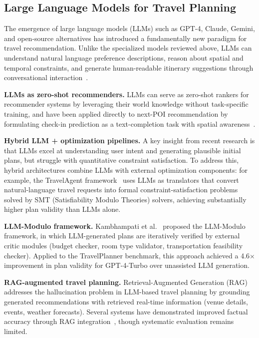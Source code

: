 \subsection{Large Language Models for Travel Planning}
\label{sec:sota-dl-llm}

The emergence of large language models (LLMs) such as GPT-4, Claude, Gemini, and open-source alternatives has introduced a fundamentally new paradigm for travel recommendation. Unlike the specialized models reviewed above, LLMs can understand natural language preference descriptions, reason about spatial and temporal constraints, and generate human-readable itinerary suggestions through conversational interaction~\cite{kozhipuram2025contextrag}.

\textbf{LLMs as zero-shot recommenders.} LLMs can serve as zero-shot rankers for recommender systems by leveraging their world knowledge without task-specific training, and have been applied directly to next-POI recommendation by formulating check-in prediction as a text-completion task with spatial awareness~\cite{li2024llm4poi}.

\textbf{Hybrid LLM + optimization pipelines.} A key insight from recent research is that LLMs excel at understanding user intent and generating plausible initial plans, but struggle with quantitative constraint satisfaction. To address this, hybrid architectures combine LLMs with external optimization components: for example, the TravelAgent framework~\cite{fan2024travelagent} uses LLMs as translators that convert natural-language travel requests into formal constraint-satisfaction problems solved by SMT (Satisfiability Modulo Theories) solvers, achieving substantially higher plan validity than LLMs alone.

\textbf{LLM-Modulo framework.} Kambhampati et al.~\cite{kambhampati2024llmmodulo} proposed the LLM-Modulo framework, in which LLM-generated plans are iteratively verified by external critic modules (budget checker, room type validator, transportation feasibility checker). Applied to the TravelPlanner benchmark, this approach achieved a 4.6$\times$ improvement in plan validity for GPT-4-Turbo over unassisted LLM generation.

\textbf{RAG-augmented travel planning.} Retrieval-Augmented Generation (RAG) addresses the hallucination problem in LLM-based travel planning by grounding generated recommendations with retrieved real-time information (venue details, events, weather forecasts). Several systems have demonstrated improved factual accuracy through RAG integration~\cite{qi2024tibetanrag, kozhipuram2025contextrag}, though systematic evaluation remains limited.

